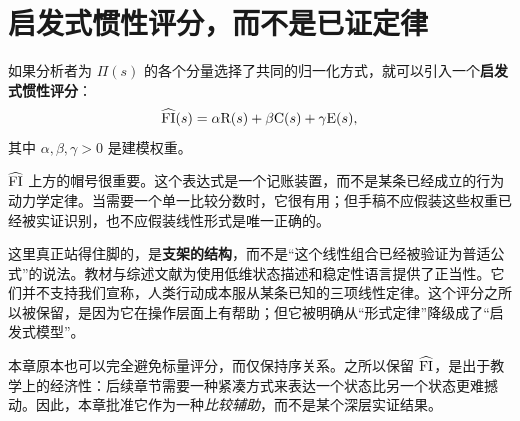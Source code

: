\section{启发式惯性评分，而不是已证定律}

\begin{definition}[启发式惯性评分]
如果分析者为 $\Pi(s)$ 的各个分量选择了共同的归一化方式，就可以引入一个\textbf{启发式惯性评分}：
\[
  \widehat{\mathrm{FI}}(s) = \alpha \mathrm{R}(s) + \beta \mathrm{C}(s) + \gamma \mathrm{E}(s),
\]
其中 $\alpha,\beta,\gamma > 0$ 是建模权重。
\end{definition}

\begin{remark}
$\widehat{\mathrm{FI}}$ 上方的帽号很重要。这个表达式是一个记账装置，而不是某条已经成立的行为动力学定律。当需要一个单一比较分数时，它很有用；但手稿不应假装这些权重已经被实证识别，也不应假装线性形式是唯一正确的。
\end{remark}

\begin{discussion}
这里真正站得住脚的，是\textbf{支架的结构}，而不是“这个线性组合已经被验证为普适公式”的说法。教材与综述文献为使用低维状态描述和稳定性语言提供了正当性。它们并不支持我们宣称，人类行动成本服从某条已知的三项线性定律。这个评分之所以被保留，是因为它在操作层面上有帮助；但它被明确从“形式定律”降级成了“启发式模型”。
\end{discussion}

\begin{remark}
本章原本也可以完全避免标量评分，而仅保持序关系。之所以保留 $\widehat{\mathrm{FI}}$，是出于教学上的经济性：后续章节需要一种紧凑方式来表达一个状态比另一个状态更难撼动。因此，本章批准它作为一种\emph{比较辅助}，而不是某个深层实证结果。
\end{remark}
